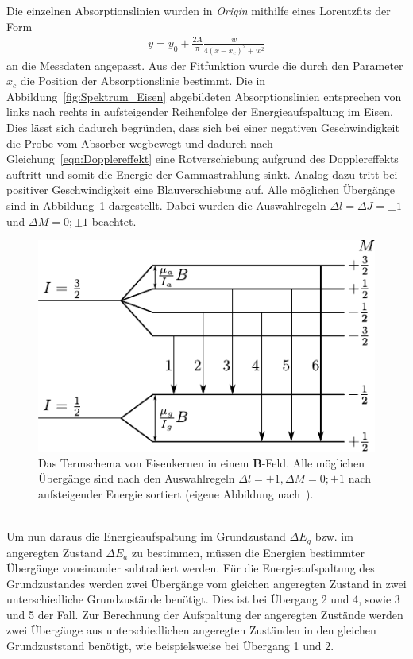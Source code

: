 \documentclass[a4paper,twoside,final]{article}
\begin{document}
Die einzelnen Absorptionslinien wurden in \textit{Origin} mithilfe eines Lorentzfits der Form
\begin{align}
  y= y_0 + \frac{2A}{\pi}\frac{w}{4(x-x_c)^2+w^2}\label{eqn:Lorentzfits}
\end{align}
an die Messdaten angepasst. Aus der Fitfunktion wurde die durch den Parameter $x_c$ die Position der Absorptionslinie bestimmt. Die in Abbildung~\ref{fig:Spektrum_Eisen} abgebildeten Absorptionslinien entsprechen von links nach rechts in aufsteigender Reihenfolge der Energieaufspaltung im Eisen. Dies lässt sich dadurch begründen, dass sich bei einer negativen Geschwindigkeit die Probe vom Absorber wegbewegt und dadurch nach Gleichung~\eqref{eqn:Dopplereffekt} eine \glqq Rotverschiebung\grqq{} aufgrund des Dopplereffekts auftritt und somit die Energie der Gammastrahlung sinkt. Analog dazu tritt bei positiver Geschwindigkeit eine \glqq Blauverschiebung\grqq{} auf. Alle möglichen Übergänge sind in Abbildung~\ref{fig:Termschema_Eisen} dargestellt. Dabei wurden die Auswahlregeln $\Delta l = \Delta J = \pm 1$ und $\Delta M = 0; \pm 1$ beachtet.
\begin{figure}[htp]
    \centering
    \includegraphics{Bilder/Termschema_Eisen.pdf}
    \caption{Das Termschema von Eisenkernen in einem $\bm{B}$-Feld. Alle möglichen Übergänge sind nach den Auswahlregeln $\Delta l = \pm 1 , \Delta M = 0; \pm 1$ nach aufsteigender Energie sortiert (eigene Abbildung nach~\cite{Schatz}).}
    \label{fig:Termschema_Eisen}
\end{figure}\\
Um nun daraus die Energieaufspaltung im Grundzustand $\Delta E_g$ bzw. im angeregten Zustand $\Delta E_a$ zu bestimmen, müssen die Energien bestimmter Übergänge voneinander subtrahiert werden. Für die Energieaufspaltung des Grundzustandes werden zwei Übergänge vom gleichen angeregten Zustand in zwei unterschiedliche Grundzustände benötigt. Dies ist bei Übergang 2 und 4, sowie 3 und 5 der Fall. Zur Berechnung der Aufspaltung der angeregten Zustände werden zwei Übergänge aus unterschiedlichen angeregten Zuständen in den gleichen Grundzuststand benötigt, wie beispielsweise bei Übergang 1 und 2.\\
\end{document}

